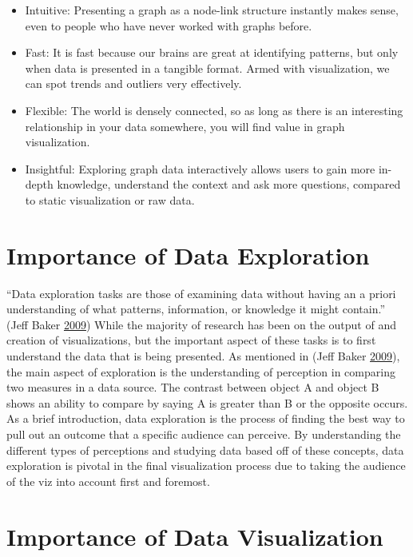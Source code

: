 \documentclass[]{book}
\providecommand{\tightlist}{%
  \setlength{\itemsep}{0pt}\setlength{\parskip}{0pt}}
\begin{document}
\begin{itemize}
\tightlist
\item
  Intuitive: Presenting a graph as a node-link structure instantly makes sense, even to people who have never worked with graphs before.
\item
  Fast: It is fast because our brains are great at identifying patterns, but only when data is presented in a tangible format. Armed with visualization, we can spot trends and outliers very effectively.
\item
  Flexible: The world is densely connected, so as long as there is an interesting relationship in your data somewhere, you will find value in graph visualization.
\item
  Insightful: Exploring graph data interactively allows users to gain more in-depth knowledge, understand the context and ask more questions, compared to static visualization or raw data.
\end{itemize}

\hypertarget{importance-of-data-exploration}{%
\section{Importance of Data Exploration}\label{importance-of-data-exploration}}

``Data exploration tasks are those of examining data without having an a priori understanding of what patterns, information, or knowledge it might contain.'' (Jeff Baker \protect\hyperlink{ref-Data_Exploration_1}{2009}) While the majority of research has been on the output of and creation of visualizations, but the important aspect of these tasks is to first understand the data that is being presented. As mentioned in (Jeff Baker \protect\hyperlink{ref-Data_Exploration_1}{2009}), the main aspect of exploration is the understanding of perception in comparing two measures in a data source. The contrast between object A and object B shows an ability to compare by saying A is greater than B or the opposite occurs. As a brief introduction, data exploration is the process of finding the best way to pull out an outcome that a specific audience can perceive. By understanding the different types of perceptions and studying data based off of these concepts, data exploration is pivotal in the final visualization process due to taking the audience of the viz into account first and foremost.

\hypertarget{importance-of-data-visualization}{%
\section{Importance of Data Visualization}\label{importance-of-data-visualization}}
\end{document}
